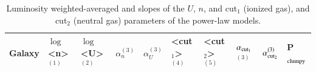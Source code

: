 \documentclass{aa}
\begin{document}
\begin{appendix}
\begin{table}[h!]
\begin{threeparttable}
\centering
\caption[Luminosity weighted-averaged and slopes of the $U$, $n$, and cut parameters of the power-law models.]{Luminosity weighted-averaged and slopes of the $U$, $n$, and cut$_1$ (ionized gas), and cut$_2$ (neutral gas) parameters of the power-law models.}
\label{table_mean_values}

\begin{tabular}{|p{}|p{}p{}p{}p{}|p{}p{}p{}p{}|p{}|}

\hline
Galaxy & $\log$ <n>$^{(1)}$&$\log$ <U>$^{(2)}$&$\alpha_n^{(3)}$&$\alpha_U^{(3)}$& <cut$_1$>$^{(4)}$ & <cut$_2$>$^{(5)}$ & $\alpha_{\rm cut_1}$$^{(3)}$&$\alpha_{\rm cut_2}^{(3)}$ & P$_{\rm clumpy}$\\ \hline 


\end{tabular}
\end{threeparttable}
\end{table}
\end{appendix}
\end{document}
